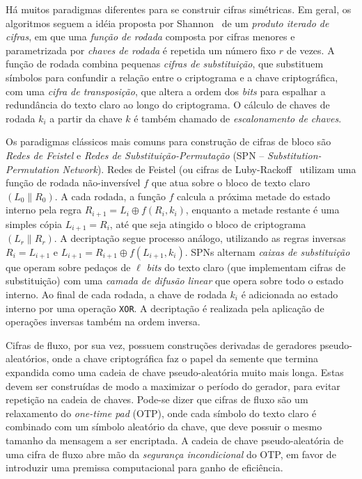 Há muitos paradigmas diferentes para se construir cifras simétricas. Em geral, os algoritmos seguem a idéia proposta por Shannon~\cite{shannon} de um \emph{produto iterado de cifras}, em que uma \emph{função de rodada} composta por cifras menores e parametrizada por \emph{chaves de rodada} é repetida um número fixo $r$ de vezes. A função de rodada combina pequenas \emph{cifras de substituição}, que substituem símbolos para confundir a relação entre o criptograma e a chave criptográfica, com uma \emph{cifra de transposição}, que altera a ordem dos \emph{bits} para espalhar a redundância do texto claro ao longo do criptograma. O cálculo de chaves de rodada $k_i$ a partir da chave $k$ é também chamado de \emph{escalonamento de chaves}.

Os paradigmas clássicos mais comuns para construção de cifras de bloco são \emph{Redes de Feistel} e \emph{Redes de Substituição-Permutação} (SPN -- \emph{Substitution-Permutation Network}). Redes de Feistel (ou cifras de Luby-Rackoff~\cite{luby-rackoff} utilizam uma função de rodada não-inversível $f$ que atua sobre o bloco de texto claro $(L_0 \parallel R_0)$. A cada rodada, a função $f$ calcula a próxima metade do estado interno pela regra $R_{i+1} = L_i \oplus f(R_i, k_i)$, enquanto a metade restante é uma simples cópia $L_{i+1} = R_i$, até que seja atingido o bloco de criptograma $(L_r \parallel R_r)$. A decriptação segue processo análogo, utilizando as regras inversas $R_{i} = L_{i+1}$ e $L_{i+1} = R_{i+1} \oplus f(L_{i+1}, k_i)$. SPNs alternam \emph{caixas de substituição} que operam sobre pedaços de $\ell$ \emph{bits} do texto claro (que implementam cifras de substituição) com uma \emph{camada de difusão linear} que opera sobre todo o estado interno. Ao final de cada rodada, a chave de rodada $k_i$ é adicionada ao estado interno por uma operação \texttt{XOR}. A decriptação é realizada pela aplicação de operações inversas também na ordem inversa.

Cifras de fluxo, por sua vez, possuem construções derivadas de geradores pseudo-aleatórios, onde a chave criptográfica faz o papel da semente que termina expandida como uma cadeia de chave pseudo-aleatória muito mais longa. Estas devem ser construídas de modo a maximizar o período do gerador, para evitar repetição na cadeia de chaves. Pode-se dizer que cifras de fluxo são um relaxamento do \emph{one-time pad} (OTP), onde cada símbolo do texto claro é combinado com um símbolo aleatório da chave, que deve possuir o mesmo tamanho da mensagem a ser encriptada. A cadeia de chave pseudo-aleatória de uma cifra de fluxo abre mão da \emph{segurança incondicional} do OTP, em favor de introduzir uma premissa computacional para ganho de eficiência.

